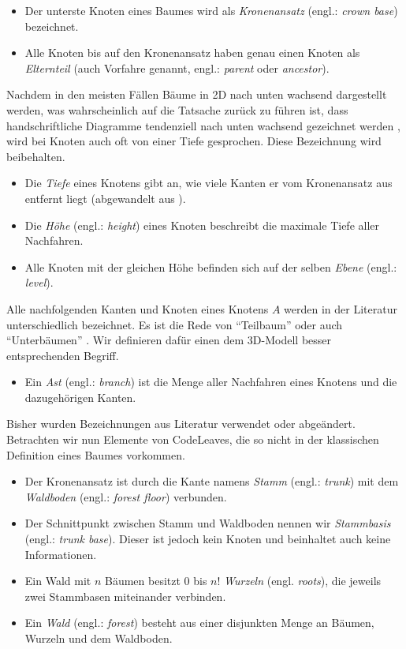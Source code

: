 \begin{itemize}
  \item Der unterste Knoten eines Baumes wird als \textit{Kronenansatz} (engl.: \textit{crown base}) bezeichnet.
  \item Alle Knoten bis auf den Kronenansatz haben genau einen Knoten als \textit{Elternteil} (auch Vorfahre genannt, engl.: \textit{parent} oder \textit{ancestor}).
\end{itemize}

Nachdem in den meisten Fällen Bäume in 2D nach unten wachsend dargestellt werden, was wahrscheinlich auf die Tatsache zurück zu führen ist, dass handschriftliche Diagramme tendenziell nach unten wachsend gezeichnet werden \cite{knuth1973fundamental}, wird bei Knoten auch oft von einer Tiefe gesprochen. Diese Bezeichnung wird beibehalten.

\begin{itemize}
  \item Die \textit{Tiefe} eines Knotens gibt an, wie viele Kanten er vom Kronenansatz aus entfernt liegt (abgewandelt aus \cite{ernst2016grundkurs}).
  \item Die \textit{Höhe} (engl.: \textit{height}) eines Knoten beschreibt die maximale Tiefe aller Nachfahren.
  \item Alle Knoten mit der gleichen Höhe befinden sich auf der selben \textit{Ebene} (engl.: \textit{level}).
\end{itemize}

Alle nachfolgenden Kanten und Knoten eines Knotens $A$ werden in der Literatur unterschiedlich bezeichnet. Es ist die Rede von "`Teilbaum"' \cite{ernst2016grundkurs} oder auch "`Unterbäumen"' \cite{gumm2009einfuehrung}. Wir definieren dafür einen dem 3D-Modell besser entsprechenden Begriff.

\begin{itemize}
  \item Ein \textit{Ast} (engl.: \textit{branch}) ist die Menge aller Nachfahren eines Knotens und die dazugehörigen Kanten.
\end{itemize}

Bisher wurden Bezeichnungen aus Literatur verwendet oder abgeändert. Betrachten wir nun Elemente von CodeLeaves, die so nicht in der klassischen Definition eines Baumes vorkommen.

\begin{itemize}
  \item Der Kronenansatz ist durch die Kante namens \textit{Stamm} (engl.: \textit{trunk}) mit dem \textit{Waldboden} (engl.: \textit{forest floor}) verbunden.
  \item Der Schnittpunkt zwischen Stamm und Waldboden nennen wir \textit{Stammbasis} (engl.: \textit{trunk base}). Dieser ist jedoch kein Knoten und beinhaltet auch keine Informationen.
  \item Ein Wald mit $n$ Bäumen besitzt $0$ bis $n!$ \textit{Wurzeln} (engl. \textit{roots}), die jeweils zwei Stammbasen miteinander verbinden.
  \item Ein \textit{Wald} (engl.: \textit{forest}) besteht aus einer disjunkten Menge an Bäumen, Wurzeln und dem Waldboden.
\end{itemize}

